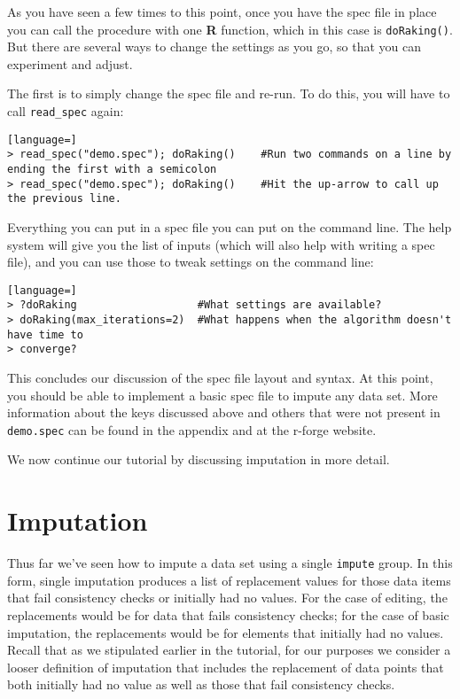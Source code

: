 \documentclass{article}
\begin{document}
{As you have seen a few times to this point, once you have the spec file in place you can
call the procedure with one \textbf{R} function, which in this case is {\tt doRaking()}. But there
are several ways to change the settings as you go, so that you can experiment and adjust.

The first is to simply change the spec file and re-run. To do this, you will have to call
{\tt read\_spec} again:
\begin{lstlisting}[language=]
> read_spec("demo.spec"); doRaking()    #Run two commands on a line by ending the first with a semicolon
> read_spec("demo.spec"); doRaking()    #Hit the up-arrow to call up the previous line.
\end{lstlisting}

Everything you can put in a spec file you can put on the command line. The help system
will give you the list of inputs (which will also help with writing a spec file), and you
can use those to tweak settings on the command line:
\begin{lstlisting}[language=]
> ?doRaking                   #What settings are available?
> doRaking(max_iterations=2)  #What happens when the algorithm doesn't have time to
> converge?
\end{lstlisting}
} %


This concludes our discussion of the spec file layout and syntax. At this point, you should be 
able to implement a basic spec file to impute any data set. More information about the keys 
discussed above and others that were not present in {\tt demo.spec} can be found in the appendix and 
at the r-forge website.

We now continue our tutorial by discussing imputation in more detail.

\section{Imputation}
Thus far we've seen how to impute a data set using a single {\tt impute} group. In this form, single 
imputation produces a list of replacement values for those data items that fail consistency checks 
or initially had no values. For the case of editing, the replacements would be for data that fails 
consistency checks; for the case of basic imputation, the replacements would be for elements that
initially had no values. Recall that as we stipulated earlier in the tutorial, for our purposes we 
consider a looser definition of imputation that includes the replacement of data points that both 
initially had no value as well as those that fail consistency checks.
\end{document}
